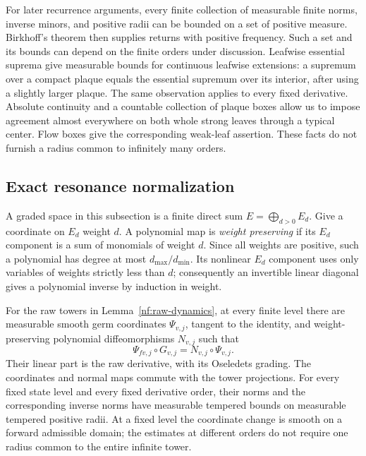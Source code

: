 For later recurrence arguments, every finite collection of measurable
finite norms, inverse minors, and positive radii can be bounded on a
set of positive measure.  Birkhoff's theorem then supplies returns
with positive frequency.  Such a set and its bounds can depend on
the finite orders under discussion.  Leafwise essential suprema give
measurable bounds for continuous leafwise extensions: a supremum over
a compact plaque equals the essential supremum over its interior,
after using a slightly larger plaque.  The same observation applies
to every fixed derivative.  Absolute continuity and a countable
collection of plaque boxes allow us to impose agreement almost
everywhere on both whole strong leaves through a typical center.
Flow boxes give the corresponding weak-leaf assertion.  These facts
do not furnish a radius common to infinitely many orders.

\subsection{Exact resonance normalization}

A graded space in this subsection is a finite direct sum
$E=\bigoplus_{d>0}E_d$.  Give a coordinate on $E_d$ weight $d$.
A polynomial map is \emph{weight preserving} if its $E_d$ component
is a sum of monomials of weight $d$.  Since all weights are positive,
such a polynomial has degree at most $d_{\max}/d_{\min}$.  Its
nonlinear $E_d$ component uses only variables of weights strictly
less than $d$; consequently an invertible linear diagonal gives a
polynomial inverse by induction in weight.

\begin{lemma}
\label{nf:normalization}
For the raw towers in Lemma~\ref{nf:raw-dynamics}, at every finite
level there are measurable smooth germ coordinates
$\Psi_{v,j}$, tangent to the identity, and weight-preserving
polynomial diffeomorphisms $N_{v,j}$ such that
\begin{equation}\label{nf:conjugacy}
 \Psi_{fv,j}\circ G_{v,j}=N_{v,j}\circ\Psi_{v,j}.
\end{equation}
Their linear part is the raw derivative, with its Oseledets grading.
The coordinates and normal maps commute with the tower projections.
For every fixed state level and every fixed derivative order, their
norms and the corresponding inverse norms have measurable tempered
bounds on measurable tempered positive radii.  At a fixed level the
coordinate change is smooth on a forward admissible domain; the
estimates at different orders do not require one radius common to
the entire infinite tower.
\end{lemma}

